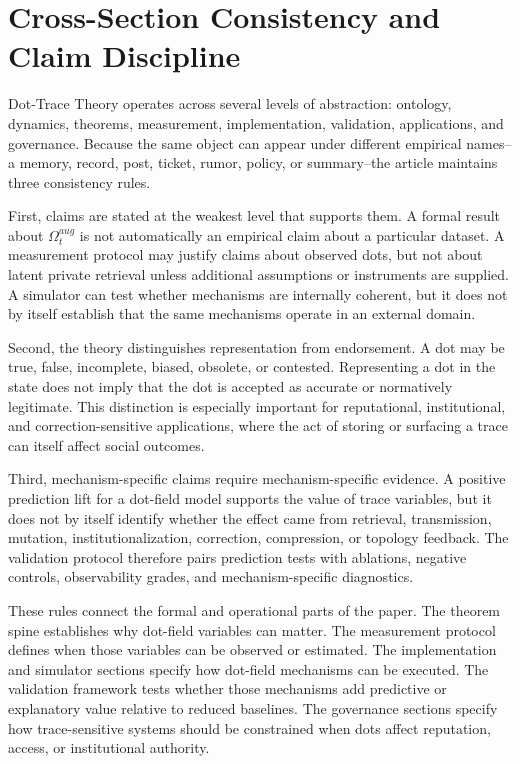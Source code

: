 \documentclass[11pt]{article}
\theoremstyle{remark}
\begin{document}
\section{Cross-Section Consistency and Claim Discipline}\label{cross-section-consistency-claim-discipline}

Dot-Trace Theory operates across several levels of abstraction: ontology, dynamics, theorems, measurement, implementation, validation, applications, and governance. Because the same object can appear under different empirical names--a memory, record, post, ticket, rumor, policy, or summary--the article maintains three consistency rules.

First, claims are stated at the weakest level that supports them. A formal result about $\Omega_t^{aug}$ is not automatically an empirical claim about a particular dataset. A measurement protocol may justify claims about observed dots, but not about latent private retrieval unless additional assumptions or instruments are supplied. A simulator can test whether mechanisms are internally coherent, but it does not by itself establish that the same mechanisms operate in an external domain.

Second, the theory distinguishes representation from endorsement. A dot may be true, false, incomplete, biased, obsolete, or contested. Representing a dot in the state does not imply that the dot is accepted as accurate or normatively legitimate. This distinction is especially important for reputational, institutional, and correction-sensitive applications, where the act of storing or surfacing a trace can itself affect social outcomes.

Third, mechanism-specific claims require mechanism-specific evidence. A positive prediction lift for a dot-field model supports the value of trace variables, but it does not by itself identify whether the effect came from retrieval, transmission, mutation, institutionalization, correction, compression, or topology feedback. The validation protocol therefore pairs prediction tests with ablations, negative controls, observability grades, and mechanism-specific diagnostics.

These rules connect the formal and operational parts of the paper. The theorem spine establishes why dot-field variables can matter. The measurement protocol defines when those variables can be observed or estimated. The implementation and simulator sections specify how dot-field mechanisms can be executed. The validation framework tests whether those mechanisms add predictive or explanatory value relative to reduced baselines. The governance sections specify how trace-sensitive systems should be constrained when dots affect reputation, access, or institutional authority.
\end{document}

